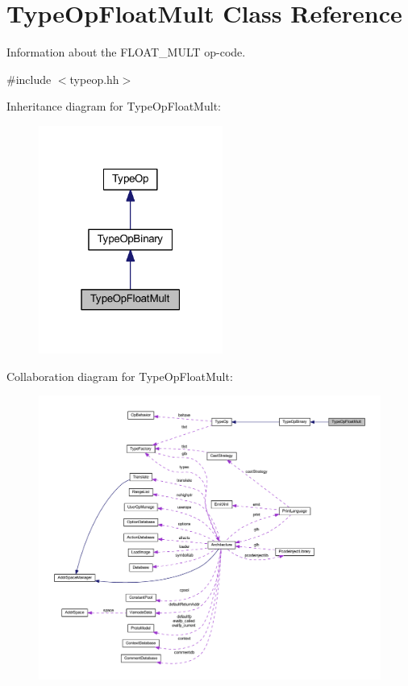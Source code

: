 \hypertarget{class_type_op_float_mult}{}\section{Type\+Op\+Float\+Mult Class Reference}
\label{class_type_op_float_mult}


Information about the F\+L\+O\+A\+T\+\_\+\+M\+U\+LT op-\/code.  




{\ttfamily \#include $<$typeop.\+hh$>$}



Inheritance diagram for Type\+Op\+Float\+Mult\+:
\nopagebreak
\begin{figure}[H]
\begin{center}
\leavevmode
\includegraphics[width=171pt]{class_type_op_float_mult__inherit__graph}
\end{center}
\end{figure}


Collaboration diagram for Type\+Op\+Float\+Mult\+:
\nopagebreak
\begin{figure}[H]
\begin{center}
\leavevmode
\includegraphics[width=350pt]{class_type_op_float_mult__coll__graph}
\end{center}
\end{figure}
